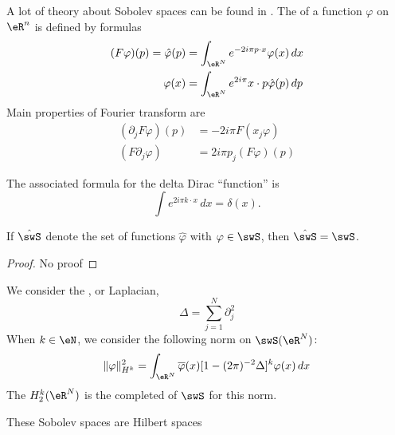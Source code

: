 A lot of theory about Sobolev spaces can be found in \cite{Maslov,Taylor_PDO}. The  of a function $\varphi$ on $\eR^n$ is defined by formulas
\begin{subequations}
\begin{align}
  (F\varphi)(p)=\hat\varphi(p)&=\int_{\eR^N} e^{-2i\pi p\cdot x}\varphi(x)\,dx\\
	\varphi(x)&=\int_{\eR^{N}} e^{2i\pi}x\cdot p\hat\varphi(p)\,dp
\end{align}
\end{subequations}
Main properties of Fourier transform are
\begin{subequations} \label{subeq_prop_Four}
\begin{align}
(\partial_jF\varphi)(p)&=-2i\pi F(x_j\varphi)\\
	(F\partial_j\varphi)&=2i\pi p_j(F\varphi)(p)
\end{align}
\end{subequations}

The associated formula for the delta Dirac ``function'' is
\begin{equation}
  \int e^{2i\pi k\cdot x}\,dx=\delta(x).
\end{equation}

\begin{proposition}
If $\hat\swS$ denote the set of functions $\hat\varphi$ with $\varphi\in\swS$, then $\hat\swS=\swS$.
\end{proposition}

\begin{proof}
No proof
\end{proof}

We consider the , or Laplacian,
\begin{equation}
\Delta=\sum_{j=1}^{N}\partial_j^2
\end{equation}
When $k\in\eN$, we consider the following norm on $\swS(\eR^N)$:
\begin{equation} \label{eq_def_norm_Sob}
  \| \varphi \|_{H^k}^2=\int_{\eR^N}\overline{\varphi}(x)[1-(2\pi)^{-2}\Delta]^k\varphi(x)\,dx
\end{equation}
The  $H^k_2(\eR^N)$ is the completed of $\swS$ for this norm.

\begin{proposition}
These Sobolev spaces are Hilbert spaces
\end{proposition}

